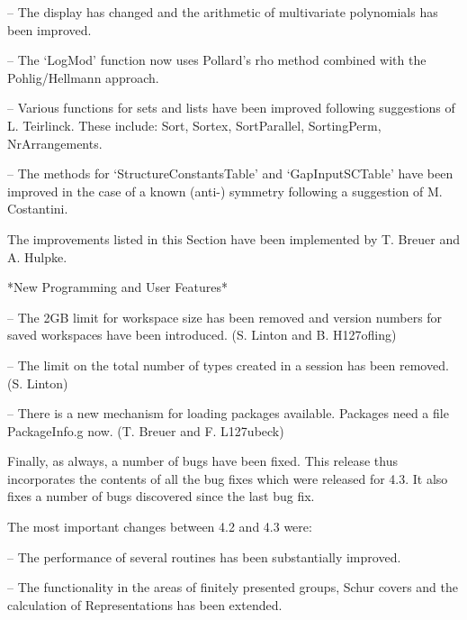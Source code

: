 \item{--}
    The display has changed and the arithmetic of multivariate polynomials
    has been improved.

\item{--}
    The `LogMod' function
    now uses Pollard's rho method combined with the Pohlig/Hellmann approach.

\item{--}
    Various functions for sets and lists have been improved following
    suggestions of L. Teirlinck. These include: Sort, Sortex, SortParallel,
    SortingPerm, NrArrangements.

\item{--}
    The methods for `StructureConstantsTable' and `GapInputSCTable' have
    been improved in the case of a known (anti-) symmetry following a
    suggestion of M. Costantini.
\endlist

The improvements listed in this Section have been implemented by T. Breuer
and A. Hulpke.

*New Programming and User Features*

\beginlist%
\item{--}
The 2GB limit for workspace size has been removed and version numbers for
saved workspaces have been introduced. (S. Linton and B. H\accent127ofling)

\item{--}
  The limit on the total number of types created in a session
           has been removed. (S. Linton)

\item{--}
  There is a new mechanism for loading packages available.
              Packages need a file PackageInfo.g now. (T. Breuer and
              F. L\accent127ubeck)
\endlist

Finally, as always, a number of bugs have been fixed. This release thus incorporates the contents
of all the bug fixes which were released for {\GAP} 4.3. It also fixes
a number of bugs discovered since the last bug fix.
\bigskip

The most important changes between {\GAP} 4.2 and {\GAP} 4.3 were:

\beginlist%

\item{--}
The performance of several routines has been substantially improved.

\item{--}
The functionality in the areas of finitely presented groups, Schur covers
and the calculation of Representations has been extended.

